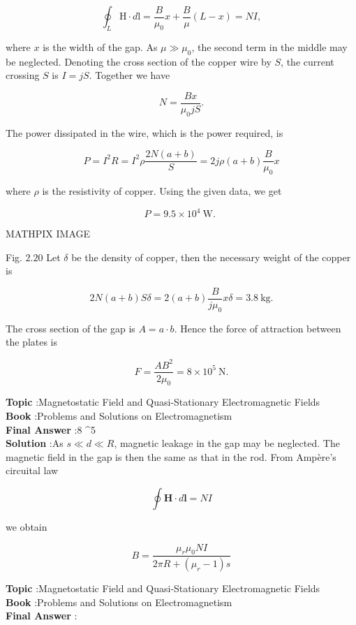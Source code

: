 \documentclass[10pt]{article}
\begin{document}
$$
\oint_{L} \mathrm{H} \cdot d \mathrm{l}=\frac{B}{\mu_{0}} x+\frac{B}{\mu}(L-x)=N I,
$$

where $x$ is the width of the gap. As $\mu \gg \mu_{0}$, the second term in the middle may be neglected. Denoting the cross section of the copper wire by $S$, the current crossing $S$ is $I=j S$. Together we have

$$
N=\frac{B x}{\mu_{0} j S} .
$$

The power dissipated in the wire, which is the power required, is

$$
P=I^{2} R=I^{2} \rho \frac{2 N(a+b)}{S}=2 j \rho(a+b) \frac{B}{\mu_{0}} x
$$

where $\rho$ is the resistivity of copper. Using the given data, we get

$$
P=9.5 \times 10^{4} \mathrm{~W} \text {. }
$$

MATHPIX IMAGE

Fig. $2.20$ Let $\delta$ be the density of copper, then the necessary weight of the copper is

$$
2 N(a+b) S \delta=2(a+b) \frac{B}{j \mu_{0}} x \delta=3.8 \mathrm{~kg} .
$$

The cross section of the gap is $A=a \cdot b$. Hence the force of attraction between the plates is

$$
F=\frac{A B^{2}}{2 \mu_{0}}=8 \times 10^{5} \mathrm{~N} .
$$

\textbf{Topic} :Magnetostatic Field and Quasi-Stationary Electromagnetic Fields\\
\textbf{Book} :Problems and Solutions on Electromagnetism\\
\textbf{Final Answer} :8 ^{5} \\


\textbf{Solution} :As $s \ll d \ll R$, magnetic leakage in the gap may be neglected. The magnetic field in the gap is then the same as that in the rod. From Ampère's circuital law

$$
\oint \mathbf{H} \cdot d \mathbf{l}=N I
$$

we obtain

$$
B=\frac{\mu_{r} \mu_{0} N I}{2 \pi R+\left(\mu_{r}-1\right) s}
$$

\textbf{Topic} :Magnetostatic Field and Quasi-Stationary Electromagnetic Fields\\
\textbf{Book} :Problems and Solutions on Electromagnetism\\
\textbf{Final Answer} :\\
\end{document}
